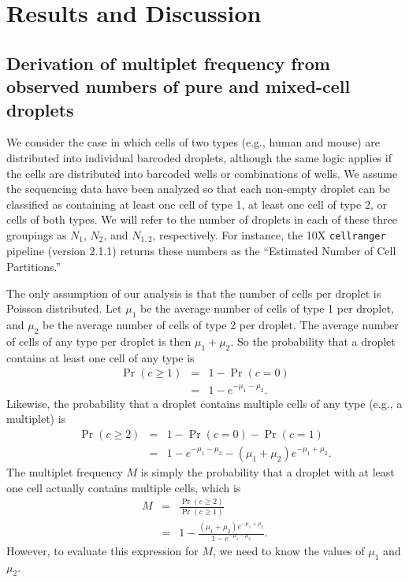 \documentclass[fleqn,10pt,lineno]{wlpeerj} %
\begin{document}
\section*{Results and Discussion}
\label{sec:results}

\subsection*{Derivation of multiplet frequency from observed numbers of pure and mixed-cell droplets}
We consider the case in which cells of two types (e.g., human and mouse) are distributed into individual barcoded droplets, although the same logic applies if the cells are distributed into barcoded wells or combinations of wells.
We assume the sequencing data have been analyzed so that each non-empty droplet can be classified as containing at least one cell of type 1, at least one cell of type 2, or cells of both types.
We will refer to the number of droplets in each of these three groupings as $N_1$, $N_2$, and $N_{1,2}$, respectively.
For instance, the 10X \texttt{cellranger} pipeline (version 2.1.1) returns these numbers as the ``Estimated Number of Cell Partitions.''

The only assumption of our analysis is that the number of cells per droplet is Poisson distributed.
Let $\mu_1$ be the average number of cells of type 1 per droplet, and $\mu_2$ be the average number of cells of type 2 per droplet.
The average number of cells of any type per droplet is then $\mu_1 + \mu_2$.
So the probability that a droplet contains at least one cell of any type is
\begin{eqnarray}
\label{eq:Pr1}
\Pr\left(c \ge 1\right) &=& 1 - \Pr\left(c = 0 \right) \nonumber \\
&=& 1 - e^{-\mu_1 - \mu_2}.
\end{eqnarray}
Likewise, the probability that a droplet contains multiple cells of any type (e.g., a multiplet) is
\begin{eqnarray}
\label{eq:Pr2}
\Pr\left(c \ge 2\right) &=& 1 - \Pr\left(c = 0\right) - \Pr\left(c = 1\right) \nonumber \\
&=& 1 - e^{-\mu_1 - \mu_2} - \left(\mu_1 + \mu_2\right) e^{-\mu_1 + \mu_2}.
\end{eqnarray}
The multiplet frequency $M$ is simply the probability that a droplet with at least one cell actually contains multiple cells, which is
\begin{eqnarray}
\label{eq:M}
M &=& \frac{\Pr\left(c \ge 2\right)}{\Pr\left(c \ge 1\right)} \nonumber \\
&=& 1 - \frac{\left(\mu_1 + \mu_2\right) e^{-\mu_1 + \mu_2}}{1 - e^{-\mu_1 - \mu_2}}.
\end{eqnarray}
However, to evaluate this expression for $M$, we need to know the values of $\mu_1$ and $\mu_2$.
\end{document}
